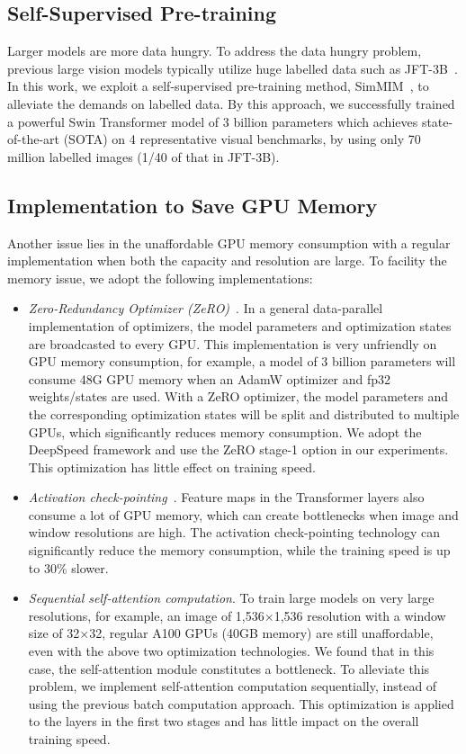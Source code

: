 \documentclass[10pt,twocolumn,letterpaper]{article}
\begin{document}
\subsection{Self-Supervised Pre-training}
Larger models are more data hungry. To address the data hungry problem, previous large vision models typically utilize huge labelled data such as JFT-3B~\cite{zhai2021scaling,riquelme2021scaling,dai2021coatnet}. In this work, we exploit a self-supervised pre-training method, SimMIM~\cite{simmim}, to alleviate the demands on labelled data. By this approach, we successfully trained a powerful Swin Transformer model of 3 billion parameters which achieves state-of-the-art (SOTA) on 4 representative visual benchmarks, by using only 70 million labelled images (1/40 of that in JFT-3B).

\subsection{Implementation to Save GPU Memory}

Another issue lies in the unaffordable GPU memory consumption with a regular implementation when both the capacity and resolution are large. To facility the memory issue, we adopt the following implementations:
\begin{itemize}
    \item \emph{Zero-Redundancy Optimizer (ZeRO)}~\cite{rajbhandari2020zero}. In a general data-parallel implementation of optimizers, the model parameters and optimization states are broadcasted to every GPU. This implementation is very unfriendly on GPU memory consumption, for example, a model of 3 billion parameters will consume 48G GPU memory when an AdamW optimizer and fp32 weights/states are used. With a ZeRO optimizer, the model parameters and the corresponding optimization states will be split and distributed to multiple GPUs, which significantly reduces memory consumption. We adopt the DeepSpeed framework and use the ZeRO stage-1 option in our experiments. This optimization has little effect on training speed.
    \item \emph{Activation check-pointing}~\cite{chen2016training}. Feature maps in the Transformer layers also consume a lot of GPU memory, which can create bottlenecks when image and window resolutions are high. The activation check-pointing technology can significantly reduce the memory consumption, while the training speed is up to 30\% slower.
    \item \emph{Sequential self-attention computation}. To train large models on very large resolutions, for example, an image of 1,536$\times$1,536 resolution with a window size of 32$\times$32, regular A100 GPUs (40GB memory) are still unaffordable, even with the above two optimization technologies. We found that in this case, the self-attention module constitutes a bottleneck. To alleviate this problem, we implement self-attention computation sequentially, instead of using the previous batch computation approach. This optimization is applied to the layers in the first two stages and has little impact on the overall training speed.
\end{itemize}
\end{document}
